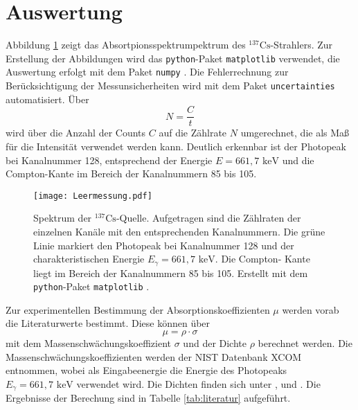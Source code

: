 \section{Auswertung}
Abbildung \ref{fig:spektrum} zeigt das Absortpionsspektrumpektrum des ${}^{137}\text{Cs}$-Strahlers.
Zur Erstellung der Abbildungen wird das \texttt{python}-Paket \texttt{matplotlib} \cite{Hunter:2007} verwendet, die Auswertung erfolgt
mit dem Paket \texttt{numpy} \cite{harris2020array}. Die Fehlerrechnung zur Berücksichtigung der Messunsicherheiten wird mit dem Paket \texttt{uncertainties} \cite{uncertainties}
automatisiert.
Über 
\begin{equation*}
    N = \frac{C}{t}
\end{equation*}
wird über die Anzahl der Counts $C$ auf die Zählrate $N$ umgerechnet, die als Maß für die Intensität
verwendet werden kann.
Deutlich erkennbar ist der Photopeak bei Kanalnummer 128, entsprechend der Energie $E= 661,7 \text{ keV}$ 
und die Compton-Kante im Bereich der Kanalnummern 85 bis 105. 
\begin{figure}
    \centering
    \texttt{[image: Leermessung.pdf]}
    \caption{Spektrum der ${}^{137}\text{Cs}$-Quelle. Aufgetragen sind die Zählraten der einzelnen
    Kanäle mit den entsprechenden Kanalnummern. Die grüne Linie markiert den Photopeak bei  
    Kanalnummer 128 und der charakteristischen Energie $E_\gamma = 661,7 \text{ keV}$. Die Compton-
    Kante liegt im Bereich der Kanalnummern 85 bis 105. Erstellt mit dem \texttt{python}-Paket \texttt{matplotlib} \cite{Hunter:2007}.}
    \label{fig:spektrum}
\end{figure}
Zur experimentellen Bestimmung der Absorptionskoeffizienten $\mu$ werden vorab die Literaturwerte bestimmt. Diese können über
\begin{equation*}
    \mu = \rho \cdot \sigma
\end{equation*}
mit dem Massenschwächungskoeffizient $\sigma$ und der Dichte $\rho$ berechnet werden. Die Massenschwächungskoeffizienten werden der NIST
Datenbank XCOM \cite{xcom} entnommen, wobei als Eingabeenergie die Energie des Photopeaks $E_\gamma = 661,7 \text{ keV}$ verwendet wird.
Die Dichten finden sich unter \cite{rsc}, \cite{delrin} und \cite{chemie}. 
Die Ergebnisse der Berechung sind in Tabelle \ref{tab:literatur} aufgeführt.
\FloatBarrier
